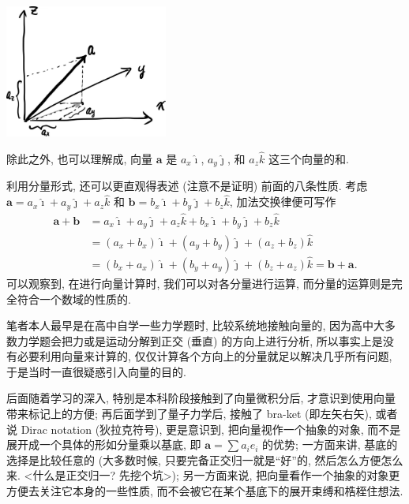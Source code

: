 \begin{tcolorbox}[size=fbox, breakable, enhanced jigsaw]
  \includegraphics[width=0.4\textwidth]{img/image-20231128170037975.png}
\end{tcolorbox}

除此之外, 也可以理解成, 向量 $\boldsymbol{a}$ 是 $a_x\hat{\imath}$,
$a_y\hat{\jmath}$, 和 $a_z\hat{k}$ 这三个向量的和.

利用分量形式, 还可以更直观得表述 (注意不是证明) 前面的八条性质. 考虑
$\boldsymbol{a}=a_x\hat{\imath}+a_y\hat{\jmath}+a_z\hat{k}$ 和
$\boldsymbol{b}=b_x\hat{\imath}+b_y\hat{\jmath}+b_z\hat{k}$,
加法交换律便可写作 \[
\begin{aligned}
\boldsymbol{a}+\boldsymbol{b}&=a_x\hat{\imath}+a_y\hat{\jmath}+a_z\hat{k}+b_x\hat{\imath}+b_y\hat{\jmath}+b_z\hat{k}\\
&=(a_x+b_x)\hat{\imath}+(a_y+b_y)\hat{\jmath}+(a_z+b_z)\hat{k}\\
&=(b_x+a_x)\hat{\imath}+(b_y+a_y)\hat{\jmath}+(b_z+a_z)\hat{k}=\boldsymbol{b}+\boldsymbol{a}.
\end{aligned}
\] 可以观察到, 在进行向量计算时, 我们可以对各分量进行运算,
而分量的运算则是完全符合一个数域的性质的.

\begin{newquote}
笔者本人最早是在高中自学一些力学题时, 比较系统地接触向量的,
因为高中大多数力学题会把力或是运动分解到正交 (垂直) 的方向上进行分析,
所以事实上是没有必要利用向量来计算的,
仅仅计算各个方向上的分量就足以解决几乎所有问题,
于是当时一直很疑惑引入向量的目的.

后面随着学习的深入, 特别是本科阶段接触到了向量微积分后,
才意识到使用向量带来标记上的方便; 再后面学到了量子力学后, 接触了 bra-ket
(即左矢右矢), 或者说 Dirac notation (狄拉克符号), 更是意识到,
把向量视作一个抽象的对象, 而不是展开成一个具体的形如分量乘以基底, 即
$\boldsymbol{a}=\sum a_i\hat{e}_i$ 的优势; 一方面来讲,
基底的选择是比较任意的 (大多数时候, 只要完备正交归一就是``好''的,
然后怎么方便怎么来. \textless 什么是正交归一? 先挖个坑\textgreater);
另一方面来说, 把向量看作一个抽象的对象更方便去关注它本身的一些性质,
而不会被它在某个基底下的展开束缚和梏桎住想法.
\end{newquote}
